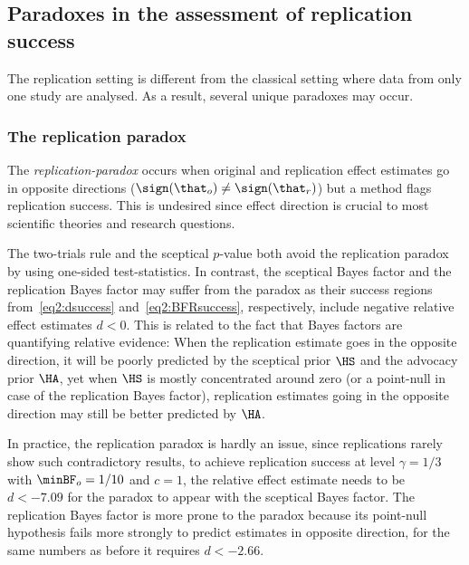 \subsection{Paradoxes in the assessment of replication success}
The replication setting is different from the classical setting where data from
only one study are analysed. As a result, several unique paradoxes may occur.

\subsubsection{The replication paradox}
\label{sec2:replicationParadox}
The \emph{replication-paradox} \citep{Ly2018} occurs when original and
replication effect estimates go in opposite directions
($\sign(\that_{o}) \neq \sign(\that_{r})$) but a method flags replication
success. This is undesired since effect direction is crucial to most
scientific theories and research questions.

The two-trials rule and the sceptical $p$-value both avoid the replication
paradox by using one-sided test-statistics. In contrast, the sceptical Bayes
factor and the replication Bayes factor may suffer from the paradox as their
success regions from~\eqref{eq2:dsuccess} and~\eqref{eq2:BFRsuccess},
respectively, include negative relative effect estimates $d < 0$. This is
related to the fact that Bayes factors are quantifying relative evidence: When
the replication estimate goes in the opposite direction, it will be poorly
predicted by the sceptical prior $\HS$ and the advocacy prior $\HA$, yet when
$\HS$ is mostly concentrated around zero (or a point-null in case of the
replication Bayes factor), replication estimates going in the opposite direction
may still be better predicted by $\HA$.


In practice, the replication paradox is hardly an issue, since replications
rarely show such contradictory results, \eg{} to achieve replication success at
level $\gamma = 1/3$ with
$\minBF_{o} = 1/10$ and $c = 1$, the
relative effect estimate needs to be $d < -7.09$ for the
paradox to appear with the sceptical Bayes factor. The replication Bayes factor
is more prone to the paradox because its point-null hypothesis fails more
strongly to predict estimates in opposite direction, \eg{} for the same numbers as
before it requires $d < -2.66$.

